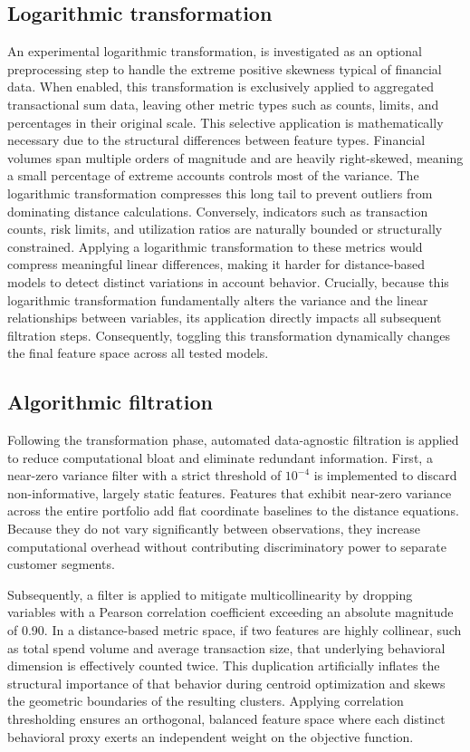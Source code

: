         \subsection{Logarithmic transformation}
        \label{subsec:log_transform}
        An experimental logarithmic transformation, is investigated as an optional preprocessing step to handle the extreme positive skewness typical of financial data. When enabled, this transformation is exclusively applied to aggregated transactional sum data, leaving other metric types such as counts, limits, and percentages in their original scale. This selective application is mathematically necessary due to the structural differences between feature types. Financial volumes span multiple orders of magnitude and are heavily right-skewed, meaning a small percentage of extreme accounts controls most of the variance. The logarithmic transformation compresses this long tail to prevent outliers from dominating distance calculations. Conversely, indicators such as transaction counts, risk limits, and utilization ratios are naturally bounded or structurally constrained. Applying a logarithmic transformation to these metrics would compress meaningful linear differences, making it harder for distance-based models to detect distinct variations in account behavior. Crucially, because this logarithmic transformation fundamentally alters the variance and the linear relationships between variables, its application directly impacts all subsequent filtration steps. Consequently, toggling this transformation dynamically changes the final feature space across all tested models.
        
        \subsection{Algorithmic filtration}
        \label{subsec:nzv_filtering_method}
        Following the transformation phase, automated data-agnostic filtration is applied to reduce computational bloat and eliminate redundant information. First, a near-zero variance filter with a strict threshold of $10^{-4}$ is implemented to discard non-informative, largely static features. Features that exhibit near-zero variance across the entire portfolio add flat coordinate baselines to the distance equations. Because they do not vary significantly between observations, they increase computational overhead without contributing discriminatory power to separate customer segments.
        
        Subsequently, a filter is applied to mitigate multicollinearity by dropping variables with a Pearson correlation coefficient exceeding an absolute magnitude of 0.90. In a distance-based metric space, if two features are highly collinear, such as total spend volume and average transaction size, that underlying behavioral dimension is effectively counted twice. This duplication artificially inflates the structural importance of that behavior during centroid optimization and skews the geometric boundaries of the resulting clusters. Applying correlation thresholding ensures an orthogonal, balanced feature space where each distinct behavioral proxy exerts an independent weight on the objective function.
                
